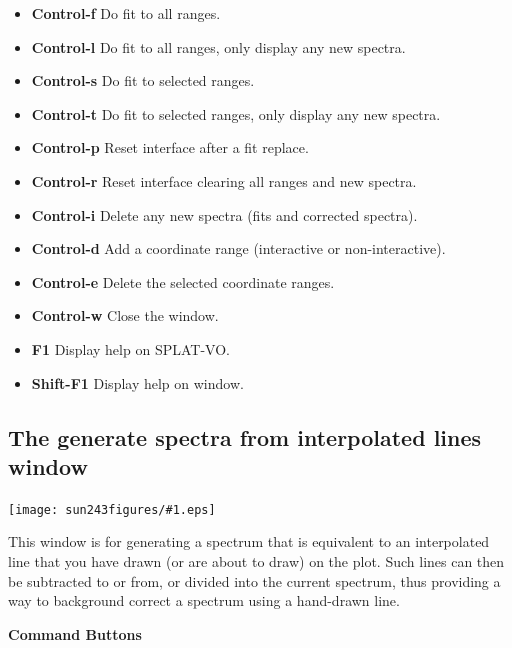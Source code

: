 \documentclass[twoside,11pt]{article}
\newcommand{\htmladdimg}[1]{}
\newcommand{\latexhtml}[2]{#1}
\renewcommand{\_}{\texttt{\symbol{95}}}
\newcommand{\SPLAT}{\textsf{SPLAT-VO}}
\newcommand{\mainfigure}[1]
{\begin{center}
 \latexhtml{\texttt{[image: sun243\_figures/\#1.eps]}}{\htmladdimg{#1.gif}}
 \end{center}
}
\newcommand{\labelitem}[1]{\textbf{#1}}
\newcommand{\subheading}[1]{\textbf{\large{#1}}}
\begin{document}
\begin{itemize}
\item \labelitem{Control-f} Do fit to all ranges.
\item \labelitem{Control-l} Do fit to all ranges, only display any new spectra.
\item \labelitem{Control-s} Do fit to selected ranges.
\item \labelitem{Control-t} Do fit to selected ranges, only display any new spectra.
\item \labelitem{Control-p} Reset interface after a fit replace.
\item \labelitem{Control-r} Reset interface clearing all ranges and new spectra.
\item \labelitem{Control-i} Delete any new spectra (fits and corrected spectra).

\item \labelitem{Control-d} Add a coordinate range (interactive or non-interactive).
\item \labelitem{Control-e} Delete the selected coordinate ranges.
 
\item \labelitem{Control-w} Close the window.
\item \labelitem{F1} Display help on \SPLAT.     
\item \labelitem{Shift-F1} Display help on window.
\end{itemize}


\newpage
\subsection{The generate spectra from interpolated lines window}

\mainfigure{generateline}

This window is for generating a spectrum that is equivalent to an interpolated
line that you have drawn (or are about to draw) on the plot. Such lines can
then be subtracted to or from, or divided into the current spectrum,
thus providing a way to background correct a spectrum using a hand-drawn line.

\subheading{Command Buttons}
\end{document}
